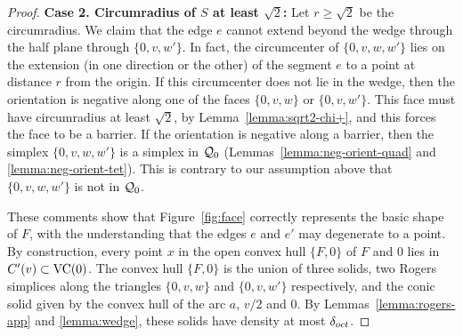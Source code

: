 \begin{proof}


{\bf Case 2. Circumradius of $S$ at least $\sqrt2$:} Let
$r\ge\sqrt2$ be the circumradius.   We claim that the edge $e$
cannot extend beyond the wedge through the half plane through
$\{0,v,w'\}$.  In fact, the circumcenter of $\{0,v,w,w'\}$ lies on
the extension (in one direction or the other) of the segment $e$
to a point at distance $r$ from the origin.  If this circumcenter
does not lie in the wedge, then the orientation is negative along
one of the faces $\{0,v,w\}$ or $\{0,v,w'\}$. This face must have
circumradius at least $\sqrt2$, by Lemma~\ref{lemma:sqrt2-chi+},
and this forces the face to be a barrier.  If the orientation is
negative along a barrier, then the simplex $\{0,v,w,w'\}$ is a
simplex in ${\mathcal Q}_0$ (Lemmas~\ref{lemma:neg-orient-quad} and
\ref{lemma:neg-orient-tet}). This is contrary to our assumption
above that $\{0,v,w,w'\}$ is not in ${\mathcal Q}_0$.





These comments show that Figure~\ref{fig:face} correctly
represents the basic shape of $F$, with the understanding that the
edges $e$ and $e'$ may degenerate to a point.  By construction,
every point $x$ in the open convex hull $\{F,0\}$ of $F$ and $0$
lies in $C'(v)\subset {\operatorname{VC}}(0)$. The convex hull $\{F,0\}$ is
the union of three solids, two Rogers simplices along the
triangles $\{0,v,w\}$ and $\{0,v,w'\}$ respectively, and the conic
solid given by the convex hull of the arc $a$, $v/2$ and $0$. By
Lemmas~\ref{lemma:rogers-app} and \ref{lemma:wedge}, these solids
have density at most $\delta_{oct}$.


\end{proof}
